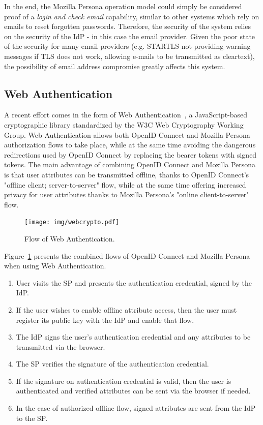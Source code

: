 In the end, the Mozilla Persona operation model could simply be considered proof of a \textit{login and check email} capability, similar to other systems which rely on emails to reset forgotten passwords. Therefore, the security of the system relies on the security of the IdP - in this case the email provider. Given the poor state of the security for many email providers (e.g. STARTLS not providing warning messages if TLS does not work, allowing e-mails to be transmitted as cleartext), the possibility of email address compromise greatly affects this system. 

\subsection{Web Authentication}
A recent effort comes in the form of Web Authentication~\cite{dahl2013web}, a JavaScript-based cryptographic library standardized by the W3C Web Cryptography Working Group. Web Authentication allows both OpenID Connect and Mozilla Persona authorization flows to take place, while at the same time avoiding the dangerous redirections used by OpenID Connect by replacing the bearer tokens with signed tokens. The main advantage of combining OpenID Connect and Mozilla Persona is that user attributes can be transmitted offline, thanks to OpenID Connect's "offline client; server-to-server" flow, while at the same time offering increased privacy for user attributes thanks to Mozilla Persona's "online client-to-server" flow.

\begin{figure}[htbp]
  \begin{center}
    \texttt{[image: img/webcrypto.pdf]}
        \caption{Flow of Web Authentication.}
        \label{fig:webcrypto-flow}
  \end{center}
\end{figure}

Figure~\ref{fig:webcrypto-flow} presents the combined flows of OpenID Connect and Mozilla Persona when using Web Authentication.\\

\begin{enumerate}
\item User visits the SP and presents the authentication credential, signed by the IdP.
\item If the user wishes to enable offline attribute access, then the user must register its public key with the IdP and enable that flow.
\item The IdP signs the user's authentication credential and any attributes to be transmitted via the browser.
\item The SP verifies the signature of the authentication credential.
\item If the signature on authentication credential is valid, then the user is authenticated and verified attributes can be sent via the browser if needed.
\item In the case of authorized offline flow, signed attributes are sent from the IdP to the SP.
\end{enumerate}

